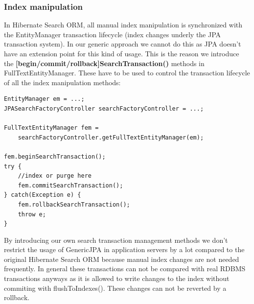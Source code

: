 \pagebreak

\subsubsection{Index manipulation} \label{using_hsearch_genericjpa_index}

In Hibernate Search ORM, all manual index manipulation is synchronized with the EntityManager transaction lifecycle (index changes underly the JPA transaction system). In our generic approach we cannot do this as JPA doesn't have an extension point for this kind of usage. This is the reason we introduce the \textbf{[begin/commit/rollback]SearchTransaction()} methods in FullTextEntityManager. These have to be used to control the transaction lifecycle of all the index manipulation methods:
\\
\lstset{language=java}
\begin{lstlisting}[frame=htrbl, caption={Index control with Hibernate Search GenericJPA}, label={lst:index_control_hibernatesearchgenericjpa}]
EntityManager em = ...;
JPASearchFactoryController searchFactoryController = ...;

FullTextEntityManager fem = 
	searchFactoryController.getFullTextEntityManager(em);

fem.beginSearchTransaction();
try {
	//index or purge here
	fem.commitSearchTransaction();
} catch(Exception e) {
	fem.rollbackSearchTransaction();
	throw e;
}
\end{lstlisting}
\noindent
By introducing our own search transaction management methods we don't restrict the usage of GenericJPA in application servers by a lot compared to the original Hibernate Search ORM because manual index changes are not needed frequently. In general these transactions can not be compared with real RDBMS transactions anyways as it is allowed to write changes to the index without commiting with flushToIndexes(). These changes can not be reverted by a rollback.

